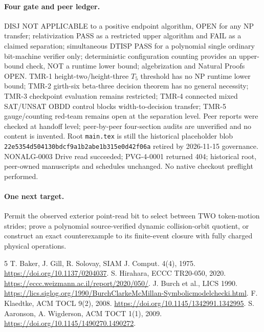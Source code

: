 \documentclass[11pt]{article}
\begin{document}
\paragraph{Four gate and peer ledger.}
DISJ NOT APPLICABLE to a positive endpoint algorithm, OPEN for any NP transfer; relativization PASS as a restricted upper algorithm and FAIL as a claimed separation; simultaneous DTISP PASS for a polynomial single ordinary bit-machine verifier only; deterministic configuration counting provides an upper-bound check, NOT a runtime lower bound; algebrization and Natural Proofs OPEN. TMR-1 height-two/height-three $T_5$ threshold has no NP runtime lower bound; TMR-2 girth-six beta-three decision theorem has no general necessity; TMR-3 checkpoint evaluation remains restricted; TMR-4 connected mixed SAT/UNSAT OBDD control blocks width-to-decision transfer; TMR-5 gauge/counting red-team remains open at the separation level. Peer reports were checked at handoff level; peer-by-peer four-section audits are unverified and no content is invented. Root \texttt{main.tex} is still the historical placeholder blob \texttt{22e5354d504130bdcf9a1b2abe1b315e0d42f06a} retired by 2026-11-15 governance. NONALG-0003 Drive read succeeded; PVG-4-0001 returned 404; historical root, peer-owned manuscripts and schedules unchanged. No native checkout preflight performed.
\paragraph{One next target.}
Permit the observed exterior point-read bit to select between TWO token-motion strides; prove a polynomial source-verified dynamic collision-orbit quotient, or construct an exact counterexample to its finite-event closure with fully charged physical operations.
\begin{thebibliography}{5}
 T. Baker, J. Gill, R. Solovay, SIAM J. Comput. 4(4), 1975. \url{https://doi.org/10.1137/0204037}.
 S. Hirahara, ECCC TR20-050, 2020. \url{https://eccc.weizmann.ac.il/report/2020/050/}.
 J. Burch et al., LICS 1990. \url{https://lics.siglog.org/1990/BurchClarkeMcMillan-Symbolicmodelchecki.html}.
 F. Klaedtke, ACM TOCL 9(2), 2008. \url{https://doi.org/10.1145/1342991.1342995}.
 S. Aaronson, A. Wigderson, ACM TOCT 1(1), 2009. \url{https://doi.org/10.1145/1490270.1490272}.
\end{thebibliography}
\end{document}
